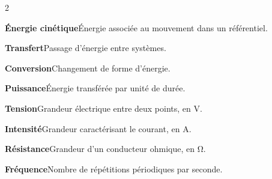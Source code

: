 \begin{multicols}{2}
\par\addvspace{2mm}\noindent\begin{minipage}{\linewidth}\textbf{Énergie cinétique}\enspace Énergie associée au mouvement dans un référentiel.\par\end{minipage}\par
\par\addvspace{2mm}\noindent\begin{minipage}{\linewidth}\textbf{Transfert}\enspace Passage d’énergie entre systèmes.\par\end{minipage}\par
\par\addvspace{2mm}\noindent\begin{minipage}{\linewidth}\textbf{Conversion}\enspace Changement de forme d’énergie.\par\end{minipage}\par
\par\addvspace{2mm}\noindent\begin{minipage}{\linewidth}\textbf{Puissance}\enspace Énergie transférée par unité de durée.\par\end{minipage}\par
\par\addvspace{2mm}\noindent\begin{minipage}{\linewidth}\textbf{Tension}\enspace Grandeur électrique entre deux points, en V.\par\end{minipage}\par
\par\addvspace{2mm}\noindent\begin{minipage}{\linewidth}\textbf{Intensité}\enspace Grandeur caractérisant le courant, en A.\par\end{minipage}\par
\par\addvspace{2mm}\noindent\begin{minipage}{\linewidth}\textbf{Résistance}\enspace Grandeur d’un conducteur ohmique, en Ω.\par\end{minipage}\par
\par\addvspace{2mm}\noindent\begin{minipage}{\linewidth}\textbf{Fréquence}\enspace Nombre de répétitions périodiques par seconde.\par\end{minipage}\par

\end{multicols}

